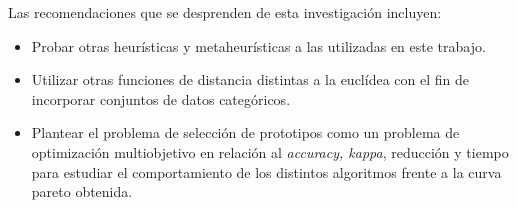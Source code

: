 Las recomendaciones que se desprenden de esta investigación incluyen: 

\begin{itemize}

\item Probar otras heurísticas y metaheurísticas a las utilizadas en este trabajo.

\item Utilizar otras funciones de distancia distintas a la euclídea con el fin de incorporar conjuntos de datos categóricos.

\item Plantear el problema de selección de prototipos como un problema de optimización multiobjetivo en relación al \emph{accuracy, kappa}, reducción y tiempo para estudiar el comportamiento de los distintos algoritmos frente a la curva pareto obtenida.

\end{itemize}

